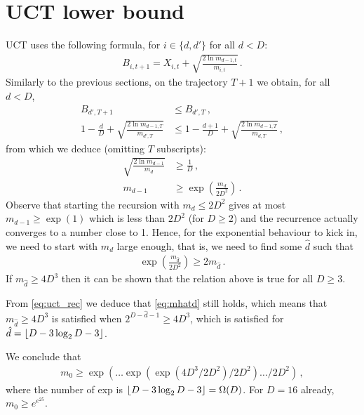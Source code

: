 \documentclass[a4paper]{article}
\begin{document}
\section{UCT lower bound}


UCT uses the following formula,
for $i\in\{d,d'\}$ for all $d<D$:
\begin{align}
    B_{i, t+1} = X_{i,t} + \sqrt{\frac{2\ln m_{d-1,t}}{m_{i,t}}}\,.
\end{align}
Similarly to the previous sections, on the trajectory $T+1$ we obtain, for all $d < D$,
\begin{align}
    B_{d', T+1} &\leq B_{d', T}\,, \\[2ex]
    1-\frac{d}D + \sqrt{\frac{2\ln m_{d-1,T}}{m_{d',T}}}
    &\leq 1-\frac{d+1}D + \sqrt{\frac{2\ln m_{d-1,T}}{m_{d,T}}}\,,
    \label{eq:uct_rec}
\end{align}
from which we deduce (omitting $T$ subscripts):
\begin{align}
    \sqrt{\frac{2\ln m_{d-1}}{m_d}} &\geq \frac1D \,,\\
    m_{d-1} &\geq \exp\left(\frac{m_d}{2D^2}\right)\,.
\end{align}
Observe that starting the recursion with $m_d \leq 2D^2$ gives at most $m_{d-1} \geq \exp(1)$ which is less than $2D^2$ (for $D\geq 2$) and the recurrence actually converges to a number close to 1.
Hence, for the exponential behaviour to kick in, we need to start with $m_d$ large enough, that is, we need to find some $\hat d$ such that 
\begin{align}
    \exp\left(\frac{m_{\hat d}}{2D^2}\right) \geq 2 m_{\hat d}\,.
\end{align}
If $m_{\hat d} \geq 4D^3$ then it can be shown that the relation above is true for all $D\geq 3$.

From \cref{eq:uct_rec} we deduce that \cref{eq:mhatd} still holds,
which means that 
$m_{\hat d} \geq 4D^3$ is satisfied when $2^{D-\hat d - 1} \geq 4D^3$,
which is satisfied for
$\hat d = \left\lfloor D - 3\log_2 D - 3\right\rfloor$.

We conclude that
\begin{align}
    m_0 \geq \exp(\dots \exp(\exp(4D^3 / 2D^2) / 2D^2) \dots/2D^2)\,,
\end{align}
where the number of exp is $\left\lfloor D - 3\log_2 D - 3\right\rfloor = \Omega(D)$.
For $D=16$ already, $m_0 \geq e^{e^{25}}$.






\end{document}
